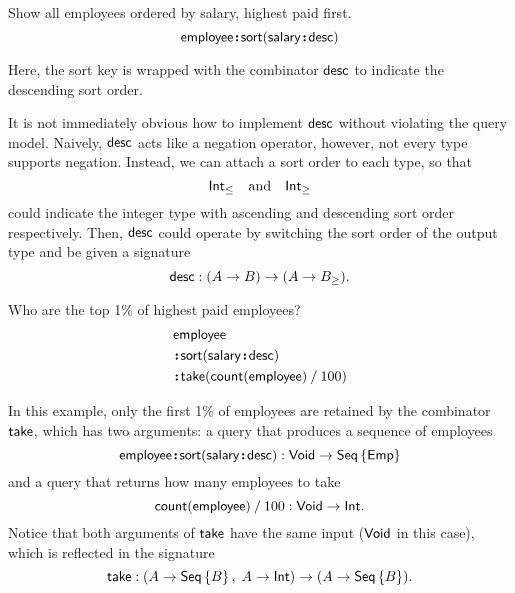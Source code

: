 \begin{example}
    \label{ex:sort-employee-by-salary-desc}
    Show all employees ordered by salary, highest paid first.
    \begin{equation*}
        \textup{\textsf{employee}}\!\boldsymbol{:}\!\textup{\textsf{sort}}(\textup{\textsf{salary}}\!\boldsymbol{:}\!\textup{\textsf{desc}})
    \end{equation*}
\end{example}

Here, the sort key is wrapped with the combinator $\textup{\textsf{desc}}$ to indicate the
descending sort order.

It is not immediately obvious how to implement $\textup{\textsf{desc}}$ without violating the
query model.  Naively, $\textup{\textsf{desc}}$ acts like a negation operator, however, not
every type supports negation.  Instead, we can attach a sort order to each
type, so that
\begin{equation*}
    \textup{\textsf{Int}}_{\le} \quad\text{and}\quad \textup{\textsf{Int}}_{\ge}
\end{equation*}
could indicate the integer type with ascending and descending sort order
respectively.  Then, $\textup{\textsf{desc}}$ could operate by switching the sort order of the
output type and be given a signature
\begin{equation*}
    \textup{\textsf{desc}} : (A \to B) \to (A \to B_{\ge}).
\end{equation*}

\begin{example}
    \label{ex:sort-employee-by-salary-take-top}
    Who are the top 1\% of highest paid employees?
    \begin{align*}
        & \textup{\textsf{employee}} \\
        & \!\boldsymbol{:}\!\textup{\textsf{sort}}(\textup{\textsf{salary}}\!\boldsymbol{:}\!\textup{\textsf{desc}}) \\
        & \!\boldsymbol{:}\!\textup{\textsf{take}}(\textup{\textsf{count}}(\textup{\textsf{employee}})\mathbin{/}100)
    \end{align*}
\end{example}

In this example, only the first 1\% of employees are retained by the combinator
$\textup{\textsf{take}}$, which has two arguments: a query that produces a sequence of employees
\begin{equation*}
    \textup{\textsf{employee}}\!\boldsymbol{:}\!\textup{\textsf{sort}}(\textup{\textsf{salary}}\!\boldsymbol{:}\!\textup{\textsf{desc}}) : \textup{\textsf{Void}} \to \textup{\textsf{Seq}}\left\{\textup{\textsf{Emp}}\right\}
\end{equation*}
and a query that returns how many employees to take
\begin{equation*}
    \textup{\textsf{count}}(\textup{\textsf{employee}})\mathbin{/}100 : \textup{\textsf{Void}} \to \textup{\textsf{Int}}.
\end{equation*}
Notice that both arguments of $\textup{\textsf{take}}$ have the same input ($\textup{\textsf{Void}}$ in this
case), which is reflected in the signature
\begin{equation*}
    \textup{\textsf{take}} : (A \to \textup{\textsf{Seq}}\left\{B\right\},\; A \to \textup{\textsf{Int}}) \to (A \to \textup{\textsf{Seq}}\left\{B\right\}).
\end{equation*}

